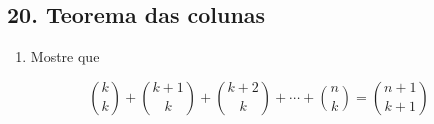 \documentclass[
  11pt]{report}
\providecommand{\tightlist}{%
  \setlength{\itemsep}{0pt}\setlength{\parskip}{0pt}}
\begin{document}
\hypertarget{teorema-das-colunas}{%
\subsection*{20. Teorema das colunas}\label{teorema-das-colunas}}

\begin{rmdbox}

\begin{enumerate}
\def\labelenumi{(\alph{enumi})}
\tightlist
\item
  Mostre que
\end{enumerate}

\[
\binom{k}{k} + \binom{k + 1}{k} + \binom{k + 2}{k} + \cdots + 
\binom{n}{k} = \binom{n + 1}{k + 1}
\]

\end{rmdbox}
\end{document}
